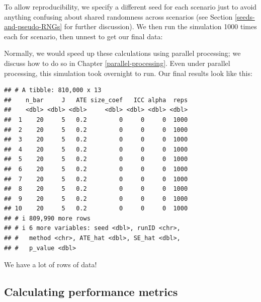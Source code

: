 \documentclass[
]{book}
\newenvironment{Shaded}{\begin{snugshade}}{\end{snugshade}}
\newcommand{\AttributeTok}[1]{\textcolor[rgb]{0.13,0.29,0.53}{#1}}
\newcommand{\DecValTok}[1]{\textcolor[rgb]{0.00,0.00,0.81}{#1}}
\newcommand{\FunctionTok}[1]{\textcolor[rgb]{0.13,0.29,0.53}{\textbf{#1}}}
\newcommand{\NormalTok}[1]{#1}
\newcommand{\OtherTok}[1]{\textcolor[rgb]{0.56,0.35,0.01}{#1}}
\newcommand{\SpecialCharTok}[1]{\textcolor[rgb]{0.81,0.36,0.00}{\textbf{#1}}}
\newcommand{\StringTok}[1]{\textcolor[rgb]{0.31,0.60,0.02}{#1}}
\begin{document}
To allow reproducibility, we specify a different seed for each scenario just to avoid anything confusing about shared randomness across scenarios (see Section \ref{seeds-and-pseudo-RNGs} for further discussion).
We then run the simulation 1000 times each for scenario, then unnest to get our final data:

\begin{Shaded}
\end{Shaded}

Normally, we would speed up these calculations using parallel processing; we discuss how to do so in Chapter \ref{parallel-processing}.
Even under parallel processing, this simulation took overnight to run.
Our final results look like this:

\begin{verbatim}
## # A tibble: 810,000 x 13
##    n_bar     J   ATE size_coef   ICC alpha  reps
##    <dbl> <dbl> <dbl>     <dbl> <dbl> <dbl> <dbl>
##  1    20     5   0.2         0     0     0  1000
##  2    20     5   0.2         0     0     0  1000
##  3    20     5   0.2         0     0     0  1000
##  4    20     5   0.2         0     0     0  1000
##  5    20     5   0.2         0     0     0  1000
##  6    20     5   0.2         0     0     0  1000
##  7    20     5   0.2         0     0     0  1000
##  8    20     5   0.2         0     0     0  1000
##  9    20     5   0.2         0     0     0  1000
## 10    20     5   0.2         0     0     0  1000
## # i 809,990 more rows
## # i 6 more variables: seed <dbl>, runID <chr>,
## #   method <chr>, ATE_hat <dbl>, SE_hat <dbl>,
## #   p_value <dbl>
\end{verbatim}

We have a lot of rows of data!

\subsection{Calculating performance metrics}\label{calculating-performance-metrics}
\end{document}
